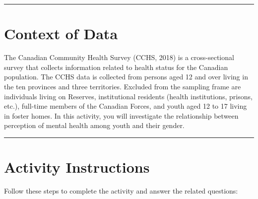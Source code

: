 \documentclass[oneside,openany]{book}
\begin{document}
\begin{center}\rule{0.5\linewidth}{0.5pt}\end{center}

\section{Context of Data}\label{context-of-data}

The Canadian Community Health Survey (CCHS, 2018) is a cross-sectional survey that collects information related to health status for the Canadian population. The CCHS data is collected from persons aged 12 and over living in the ten provinces and three territories. Excluded from the sampling frame are individuals living on Reserves, institutional residents (health institutions, prisons, etc.), full-time members of the Canadian Forces, and youth aged 12 to 17 living in foster homes. In this activity, you will investigate the relationship between perception of mental health among youth and their gender.

\begin{center}\rule{0.5\linewidth}{0.5pt}\end{center}

\section{Activity Instructions}\label{activity-instructions}

Follow these steps to complete the activity and answer the related questions:
\end{document}
